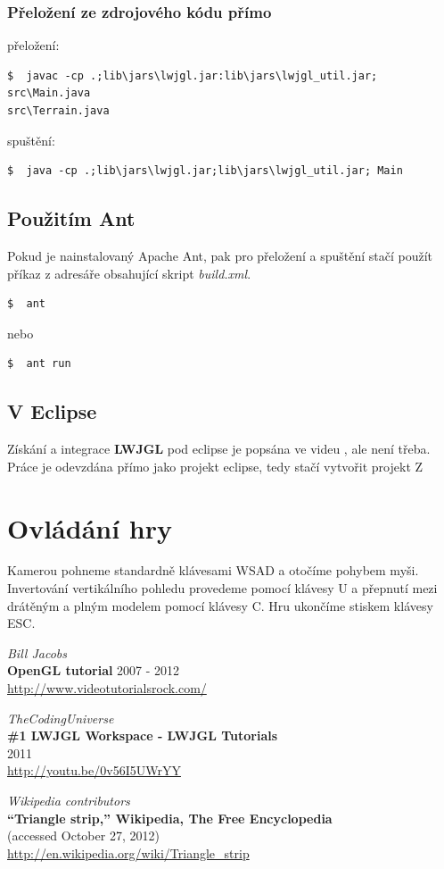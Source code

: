 \documentclass[11pt]{article}
\begin{document}
\subsubsection{Přeložení ze zdrojového kódu přímo}
přeložení:
\begin{verbatim}
$  javac -cp .;lib\jars\lwjgl.jar:lib\jars\lwjgl_util.jar; src\Main.java
src\Terrain.java
\end{verbatim}
spuštění:
\begin{verbatim}
$  java -cp .;lib\jars\lwjgl.jar;lib\jars\lwjgl_util.jar; Main
\end{verbatim}


\subsection{Použitím Ant}
Pokud je nainstalovaný Apache Ant, pak pro přeložení a spuštění stačí použít příkaz z adresáře obsahující skript \textit{build.xml}.
\begin{verbatim}
$  ant
\end{verbatim}
nebo 
\begin{verbatim}
$  ant run
\end{verbatim}

\subsection{V Eclipse}
Získání a integrace \textbf {LWJGL} pod eclipse je popsána ve videu
\cite{installtut}, ale není třeba. Práce je odevzdána přímo jako projekt
eclipse, tedy stačí vytvořit projekt Z


\section{Ovládání hry}
Kamerou pohneme standardně klávesami WSAD a otočíme pohybem myši. Invertování
vertikálního pohledu provedeme pomocí klávesy U a přepnutí mezi drátěným a
plným modelem pomocí klávesy C. Hru ukončíme stiskem klávesy ESC.


\begin{thebibliography}{3}
{\em Bill Jacobs} \\
{\bf OpenGL tutorial}
	2007 - 2012 \\
\url{http://www.videotutorialsrock.com/}

{\em TheCodingUniverse} \\
{\bf \#1 LWJGL Workspace - LWJGL Tutorials} \\
	2011 \\
\url{http://youtu.be/0v56I5UWrYY}

{\em Wikipedia contributors} \\
{\bf ``Triangle strip,'' Wikipedia, The Free Encyclopedia} \\
	(accessed October 27, 2012) \\
\url{http://en.wikipedia.org/wiki/Triangle_strip}


\end{thebibliography}
\end{document}
